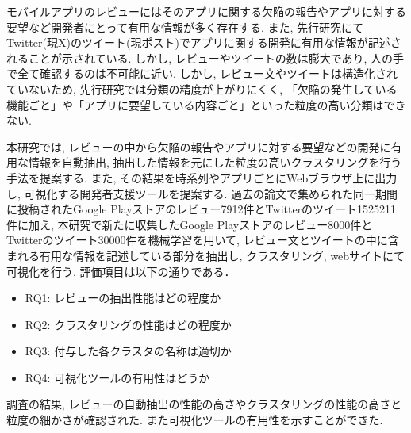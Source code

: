 
モバイルアプリのレビューにはそのアプリに関する欠陥の報告やアプリに対する要望など開発者にとって有用な情報が多く存在する. また, 先行研究にてTwitter(現X)のツイート(現ポスト)でアプリに関する開発に有用な情報が記述されることが示されている. しかし, レビューやツイートの数は膨大であり, 人の手で全て確認するのは不可能に近い. 
しかし, レビュー文やツイートは構造化されていないため, 先行研究では分類の精度が上がりにくく, 「欠陥の発生している機能ごと」や「アプリに要望している内容ごと」といった粒度の高い分類はできない. 

本研究では, レビューの中から欠陥の報告やアプリに対する要望などの開発に有用な情報を自動抽出, 抽出した情報を元にした粒度の高いクラスタリングを行う手法を提案する. また, その結果を時系列やアプリごとにWebブラウザ上に出力し, 可視化する開発者支援ツールを提案する.
過去の論文で集められた同一期間に投稿されたGoogle Playストアのレビュー7912件とTwitterのツイート1525211件に加え, 本研究で新たに収集したGoogle Playストアのレビュー8000件とTwitterのツイート30000件を機械学習を用いて, レビュー文とツイートの中に含まれる有用な情報を記述している部分を抽出し, クラスタリング, webサイトにて可視化を行う. 評価項目は以下の通りである．
\begin{itemize}
    \item RQ1: レビューの抽出性能はどの程度か
    \item RQ2: クラスタリングの性能はどの程度か
    \item RQ3: 付与した各クラスタの名称は適切か
    \item RQ4: 可視化ツールの有用性はどうか
\end{itemize}

調査の結果, レビューの自動抽出の性能の高さやクラスタリングの性能の高さと粒度の細かさが確認された. また可視化ツールの有用性を示すことができた. 
